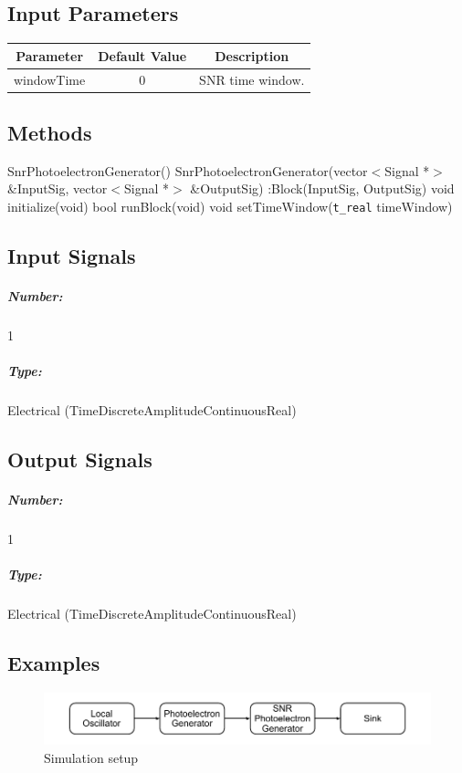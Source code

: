 \begin{refsection}
\subsection*{Input Parameters}

\begin{table}[H]
	\centering
	\begin{tabular}{|c|c|c|}
		\hline
		\textbf{Parameter}	& \textbf{Default Value}	& \textbf{Description} \\
		\hline
		windowTime			& 0							& SNR time window. \\
		\hline
	\end{tabular}
\end{table}




\subsection*{Methods}

SnrPhotoelectronGenerator() {}
\bigbreak
SnrPhotoelectronGenerator(vector$<$Signal *$>$ \&InputSig, vector$<$Signal *$>$ \&OutputSig) :Block(InputSig, OutputSig) {}
\bigbreak
void initialize(void)
\bigbreak
bool runBlock(void)
\bigbreak
void setTimeWindow(\texttt{t\_real} timeWindow)
%
%
%
%
\pagebreak

\subsection*{Input Signals}

\subparagraph*{Number:} 1

\subparagraph*{Type:} Electrical (TimeDiscreteAmplitudeContinuousReal)

\subsection*{Output Signals}

\subparagraph*{Number:} 1

\subparagraph*{Type:} Electrical (TimeDiscreteAmplitudeContinuousReal)

\subsection*{Examples}

\begin{figure}[h]
	\centering
	\includegraphics[width=\textwidth]{./lib/snr_photoelectron_generator/figures/scheme-simulation.pdf}
	\caption{Simulation setup}
\end{figure}


\end{refsection}
